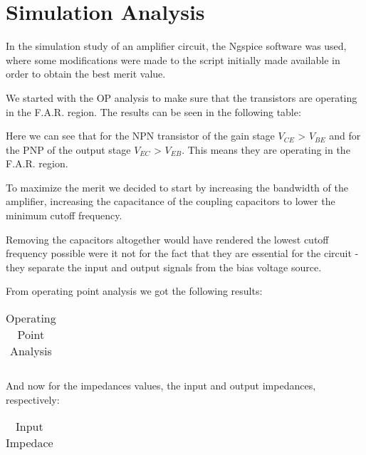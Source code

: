 \section{Simulation Analysis}
\label{sec:simulation} 

In the simulation study of an amplifier circuit, the Ngspice software was used, where some modifications were made to the script initially made available in order to obtain the best merit value.

We started with the OP analysis to make sure that the transistors are operating in the F.A.R. region. The results can be seen in the following table:

Here we can see that for the NPN transistor of the gain stage $V_{CE}$ > $V_{BE}$ and for the PNP of the output stage $V_{EC}$ > $V_{EB}$. This means they are operating in the F.A.R. region.

To maximize the merit we decided to start by increasing the bandwidth of the amplifier, increasing the capacitance of the coupling capacitors to lower the minimum cutoff frequency.

Removing the capacitors altogether would have rendered the lowest cutoff frequency possible were it not for the fact that they are essential for the circuit - they separate the input and output signals from the bias voltage source.


From operating point analysis we got the following results:
\FloatBarrier
\begin{table}[h]
  \centering
  \begin{tabular}{|c|c|c|c|c|}
    \hline    
    
    \hline
  \end{tabular}
  \caption{Operating Point Analysis}
  \label{tab:Spice1}
\end{table}
\FloatBarrier  

And now for the impedances values, the input and output impedances, respectively:

\FloatBarrier
\begin{table}[h]
  \centering
  \begin{tabular}{|c|c|}
    \hline    
    
    \hline
  \end{tabular}
  \caption{Input Impedace}
  \label{tab:Spice1}
\end{table}
\FloatBarrier   

%    




